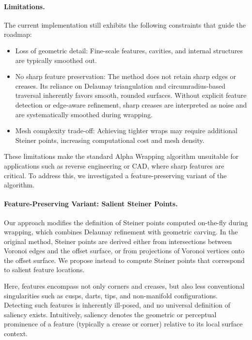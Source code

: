 \paragraph{Limitations.}
The current implementation still exhibits the following constraints that guide the roadmap:
\begin{itemize}
\item Loss of geometric detail: Fine-scale features, cavities, and internal structures are typically smoothed out.
\item No sharp feature preservation: The method does not retain sharp edges or creases. Its reliance on Delaunay triangulation and circumradius-based traversal inherently favors smooth, rounded surfaces. Without explicit feature detection or edge-aware refinement, sharp creases are interpreted as noise and are systematically smoothed during wrapping.
\item Mesh complexity trade-off: Achieving tighter wraps may require additional Steiner points, increasing computational cost and mesh density.
\end{itemize}

These limitations make the standard Alpha Wrapping algorithm unsuitable for applications such as reverse engineering or CAD, where sharp features are critical. To address this, we investigated a feature-preserving variant of the algorithm.

\paragraph{Feature-Preserving Variant: Salient Steiner Points.}

Our approach modifies the definition of Steiner points computed on-the-fly during wrapping, which combines Delaunay refinement with geometric carving. In the original method, Steiner points are derived either from intersections between Voronoi edges and the offset surface, or from projections of Voronoi vertices onto the offset surface. We propose instead to compute Steiner points that correspond to salient feature locations.

Here, features encompass not only corners and creases, but also less conventional singularities such as cusps, darts, tips, and non-manifold configurations. Detecting such features is inherently ill-posed, and no universal definition of saliency exists. Intuitively, saliency denotes the geometric or perceptual prominence of a feature (typically a crease or corner) relative to its local surface context.

